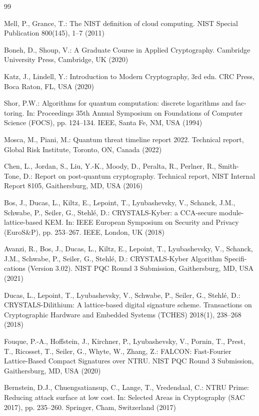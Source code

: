 \documentclass[5p,times]{elsarticle}
\begin{document}
\FloatBarrier
\begin{thebibliography}{99}

Mell, P., Grance, T.: The NIST definition of cloud computing. NIST Special Publication 800(145), 1--7 (2011)

Boneh, D., Shoup, V.: A Graduate Course in Applied Cryptography. Cambridge University Press, Cambridge, UK (2020)

Katz, J., Lindell, Y.: Introduction to Modern Cryptography, 3rd edn. CRC Press, Boca Raton, FL, USA (2020)

Shor, P.W.: Algorithms for quantum computation: discrete logarithms and fac- toring. In: Proceedings 35th Annual Symposium on Foundations of Computer Science (FOCS), pp. 124--134. IEEE, Santa Fe, NM, USA (1994)

Mosca, M., Piani, M.: Quantum threat timeline report 2022. Technical report, Global Risk Institute, Toronto, ON, Canada (2022)

Chen, L., Jordan, S., Liu, Y.-K., Moody, D., Peralta, R., Perlner, R., Smith- Tone, D.: Report on post-quantum cryptography. Technical report, NIST Internal Report 8105, Gaithersburg, MD, USA (2016)

Bos, J., Ducas, L., Kiltz, E., Lepoint, T., Lyubashevsky, V., Schanck, J.M., Schwabe, P., Seiler, G., Stehl{\'e}, D.: CRYSTALS-Kyber: a CCA-secure module- lattice-based KEM. In: IEEE European Symposium on Security and Privacy (EuroS\&P), pp. 253--267. IEEE, London, UK (2018)

Avanzi, R., Bos, J., Ducas, L., Kiltz, E., Lepoint, T., Lyubashevsky, V., Schanck, J.M., Schwabe, P., Seiler, G., Stehl{\'e}, D.: CRYSTALS-Kyber Algorithm Specifi- cations (Version 3.02). NIST PQC Round 3 Submission, Gaithersburg, MD, USA (2021)

Ducas, L., Lepoint, T., Lyubashevsky, V., Schwabe, P., Seiler, G., Stehl{\'e}, D.: CRYSTALS-Dilithium: A lattice-based digital signature scheme. Transactions on Cryptographic Hardware and Embedded Systems (TCHES) 2018(1), 238--268 (2018)

Fouque, P.-A., Hoffstein, J., Kirchner, P., Lyubashevsky, V., Pornin, T., Prest, T., Ricosset, T., Seiler, G., Whyte, W., Zhang, Z.: FALCON: Fast-Fourier Lattice-Based Compact Signatures over NTRU. NIST PQC Round 3 Submission, Gaithersburg, MD, USA (2020)

Bernstein, D.J., Chuengsatiansup, C., Lange, T., Vredendaal, C.: NTRU Prime: Reducing attack surface at low cost. In: Selected Areas in Cryptography (SAC 2017), pp. 235--260. Springer, Cham, Switzerland (2017)


\end{thebibliography}
\end{document}
